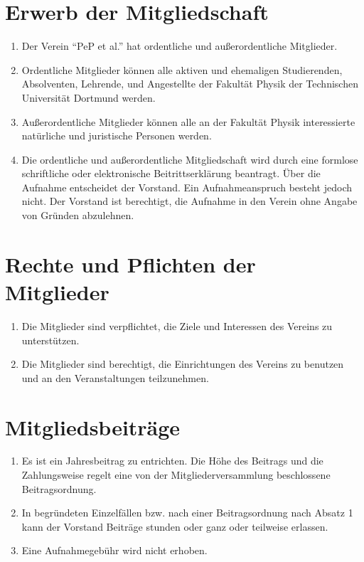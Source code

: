 \documentclass[
  fontsize=12pt,
  paper=a4,
  DIV14,
  parskip,
]{scrartcl}
\begin{document}
\section{Erwerb der Mitgliedschaft}

\begin{enumerate}
	\item Der Verein \enquote{PeP et al.} hat ordentliche und
		außerordentliche Mitglieder.
	\item Ordentliche Mitglieder können alle aktiven und ehemaligen Studierenden,
		Absolventen, Lehrende, und Angestellte der Fakultät Physik der Technischen
		Universität Dortmund werden.
	\item Außerordentliche Mitglieder können alle an der Fakultät Physik
		interessierte natürliche und juristische Personen werden.
	\item Die ordentliche und außerordentliche Mitgliedschaft wird durch eine
		formlose schriftliche oder elektronische Beitrittserklärung beantragt.
		Über die Aufnahme entscheidet der Vorstand. Ein Aufnahmeanspruch besteht
		jedoch nicht. Der Vorstand ist berechtigt, die Aufnahme in den Verein ohne
		Angabe von Gründen abzulehnen.
\end{enumerate}

\section{Rechte und Pflichten der Mitglieder}

\begin{enumerate}
	\item Die Mitglieder sind verpflichtet, die Ziele und Interessen des
		Vereins zu unterstützen.
	\item Die Mitglieder sind berechtigt, die Einrichtungen des Vereins zu
		benutzen und an den Veranstaltungen teilzunehmen.
\end{enumerate}

\section{Mitgliedsbeiträge}

\begin{enumerate}
	\item Es ist ein Jahresbeitrag zu entrichten. Die Höhe des Beitrags und
		die Zahlungsweise regelt eine von der Mitgliederversammlung beschlossene
		Beitragsordnung.
	\item In begründeten Einzelfällen bzw. nach einer Beitragsordnung nach Absatz
		1 kann der Vorstand Beiträge stunden oder ganz oder teilweise erlassen.
	\item Eine Aufnahmegebühr wird nicht erhoben.
\end{enumerate}
\end{document}
